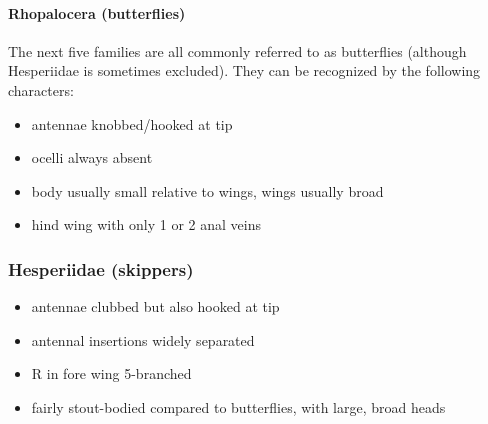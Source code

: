 \documentclass[letterpaper, 11pt]{article}
\begin{document}
\paragraph{Rhopalocera (butterflies)} The next five families are all commonly referred to as butterflies (although Hesperiidae is sometimes excluded). They can be recognized by the following characters:
\begin{itemize}
\item antennae knobbed/hooked at tip
\item ocelli always absent
\item body usually small relative to wings, wings usually broad
\item hind wing with only 1 or 2 anal veins
\end{itemize}

\subsubsection{Hesperiidae (skippers)}
\begin{itemize}
\item antennae clubbed but also hooked at tip 
\item antennal insertions widely separated
\item R in fore wing 5-branched
\item fairly stout-bodied compared to butterflies, with large, broad heads
\end{itemize}
\end{document}
